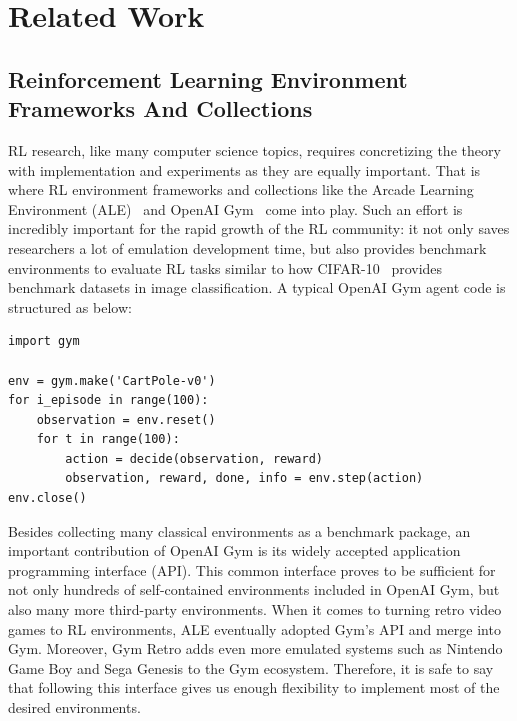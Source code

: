 \section{Related Work}

\subsection{Reinforcement Learning Environment Frameworks And Collections}
RL research, like many computer science topics, requires concretizing the theory with implementation and experiments as they are equally important. That is where RL environment frameworks and collections like the Arcade Learning Environment (ALE)~\parencite{ale} and OpenAI Gym~\parencite{openai-gym} come into play. Such an effort is incredibly important for the rapid growth of the RL community: it not only saves researchers a lot of emulation development time, but also provides benchmark environments to evaluate RL tasks similar to how CIFAR-10~\parencite{cifar-10} provides benchmark datasets in image classification. A typical OpenAI Gym agent code is structured as below:

\begin{code}
\begin{verbatim}
import gym

env = gym.make('CartPole-v0')
for i_episode in range(100):
    observation = env.reset()
    for t in range(100):
        action = decide(observation, reward)
        observation, reward, done, info = env.step(action)
env.close()
\end{verbatim}
\label{code:gym-agent}
\end{code}

Besides collecting many classical environments as a benchmark package, an important contribution of OpenAI Gym is its widely accepted application programming interface (API). This common interface proves to be sufficient for not only hundreds of self-contained environments included in OpenAI Gym, but also many more third-party environments. When it comes to turning retro video games to RL environments, ALE eventually adopted Gym's API and merge into Gym. Moreover, Gym Retro \parencite{gym-retro} adds even more emulated systems such as Nintendo Game Boy and Sega Genesis to the Gym ecosystem. Therefore, it is safe to say that following this interface gives us enough flexibility to implement most of the desired environments.

